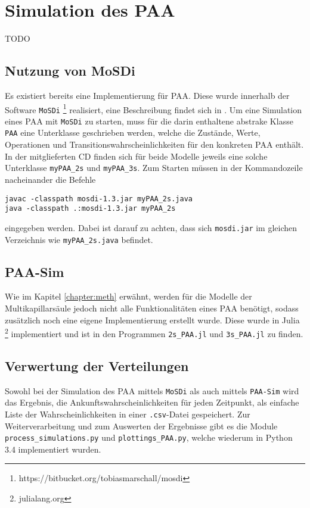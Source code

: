 
\section{Simulation des PAA}
TODO

\subsection{Nutzung von MoSDi}
Es existiert bereits eine Implementierung für PAA. Diese wurde innerhalb der Software \texttt{MoSDi} \footnote{https://bitbucket.org/tobiasmarschall/mosdi} realisiert, eine Beschreibung findet sich in \cite{Marschall2011}. Um eine Simulation eines PAA mit \texttt{MoSDi} zu starten, muss für die darin enthaltene abstrake Klasse \texttt{PAA} eine Unterklasse geschrieben werden, welche die Zustände, Werte, Operationen und Transitionswahrscheinlichkeiten für den konkreten PAA enthält. In der mitglieferten CD finden sich für beide Modelle jeweils eine solche Unterklasse \texttt{myPAA\_2s} und \texttt{myPAA\_3s}. 
Zum Starten müssen in der Kommandozeile nacheinander die Befehle
\begin{verbatim}
javac -classpath mosdi-1.3.jar myPAA_2s.java
java -classpath .:mosdi-1.3.jar myPAA_2s 
\end{verbatim}
eingegeben werden. Dabei ist darauf zu achten, dass sich \texttt{mosdi.jar} im gleichen Verzeichnis wie \texttt{myPAA\_2s.java} befindet. 

\subsection{PAA-Sim}
Wie im Kapitel \ref{chapter:meth} erwähnt, werden für die Modelle der Multikapillarsäule jedoch nicht alle Funktionalitäten eines PAA benötigt, sodass zusätzlich noch eine eigene Implementierung erstellt wurde. Diese wurde in Julia \footnote{julialang.org} implementiert und ist in den Programmen \verb!2s_PAA.jl! und \verb!3s_PAA.jl! zu finden.


\subsection{Verwertung der Verteilungen}
Sowohl bei der Simulation des PAA mittels \texttt{MoSDi} als auch mittels \texttt{PAA-Sim} wird das Ergebnis, die Ankunftswahrscheinlichkeiten für jeden Zeitpunkt, als einfache Liste der Wahrscheinlichkeiten in einer \texttt{.csv}-Datei gespeichert. Zur Weiterverarbeitung und zum Auswerten der Ergebnisse gibt es die Module \verb!process_simulations.py! und \verb!plottings_PAA.py!, welche wiederum in Python 3.4 implementiert wurden.

